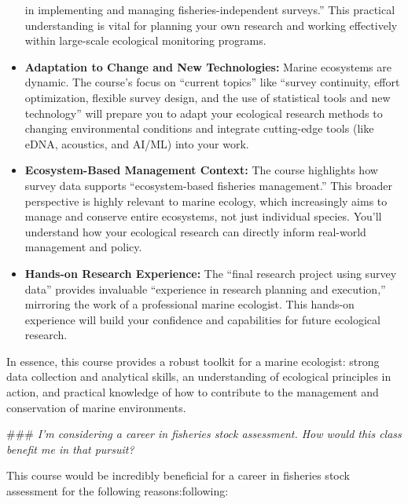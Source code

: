 \documentclass[
  letterpaper,
  oneside,
  open=any]{scrbook}
\begin{document}
\begin{itemize}
  in implementing and managing fisheries-independent surveys.'' This
  practical understanding is vital for planning your own research and
  working effectively within large-scale ecological monitoring programs.
\item
  \textbf{Adaptation to Change and New Technologies:} Marine ecosystems
  are dynamic. The course's focus on ``current topics'' like ``survey
  continuity, effort optimization, flexible survey design, and the use
  of statistical tools and new technology'' will prepare you to adapt
  your ecological research methods to changing environmental conditions
  and integrate cutting-edge tools (like eDNA, acoustics, and AI/ML)
  into your work.
\item
  \textbf{Ecosystem-Based Management Context:} The course highlights how
  survey data supports ``ecosystem-based fisheries management.'' This
  broader perspective is highly relevant to marine ecology, which
  increasingly aims to manage and conserve entire ecosystems, not just
  individual species. You'll understand how your ecological research can
  directly inform real-world management and policy.
\item
  \textbf{Hands-on Research Experience:} The ``final research project
  using survey data'' provides invaluable ``experience in research
  planning and execution,'' mirroring the work of a professional marine
  ecologist. This hands-on experience will build your confidence and
  capabilities for future ecological research.
\end{itemize}

In essence, this course provides a robust toolkit for a marine
ecologist: strong data collection and analytical skills, an
understanding of ecological principles in action, and practical
knowledge of how to contribute to the management and conservation of
marine environments.

\#\#\# \emph{I'm considering a career in fisheries stock assessment. How
would this class benefit me in that pursuit?}

This course would be incredibly beneficial for a career in fisheries
stock assessment for the following reasons:following:
\end{document}

